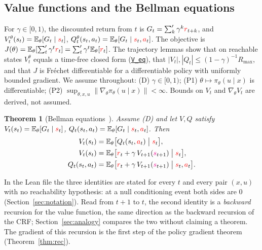 \documentclass[11pt,a4paper]{article}
\newcommand{\lmod}[2]{\href{http://www.lemma.cn/lean/?module=#2}{\nolinkurl{#1}}}
\newtheorem{theorem}{Theorem}[section]
\newcommand{\E}{\mathbb{E}}
\newcommand{\rv}[1]{{\color{red}#1}}       %
\newcommand{\ra}[1]{{\color{magenta}#1}}   %
\newcommand{\sv}{\rv{s}}
\newcommand{\av}{\rv{a}}
\newcommand{\rw}{\rv{r}}
\newcommand{\grad}{\nabla_{\theta}}
\newcommand{\tsum}{\textstyle\sum'}
\begin{document}
\subsection{Value functions and the Bellman equations}
\label{sec:bellmaneq}
For $\gamma\in[0,1)$, the discounted return from $t$ is $G_t=\tsum_k\gamma^k\rw_{t+k}$, and
$V_t^\theta(s_t)=\E_\theta[G_t\mid\sv_t]$, $Q_t^\theta(s_t,a_t)=\E_\theta[G_t\mid\sv_t,\av_t]$.
The objective is $J(\theta)=\E_\theta[\tsum_t\gamma^t\rw_t]=\tsum_t\gamma^t\E_\theta[\rw_t]$.
The trajectory lemmas show that on reachable states $V_t^\theta$ equals a time-free closed form (\lmod{V_eq}{Random.V.eq.TSum_MulPowWRc.of.Ne0Real_Preimage.In_Ico}), that $|V_t|,|Q_t|\le(1-\gamma)^{-1}R_{\max}$, and that $J$ is Fr\'echet differentiable for a differentiable policy with uniformly bounded gradient.
We assume throughout:
(D) $\gamma\in[0,1)$; (P1) $\theta\mapsto\pi_\theta(u\mid x)$ is differentiable; (P2) $\sup_{\theta,x,u}\|\grad\pi_\theta(u\mid x)\|<\infty$.
Bounds on $V_t$ and $\grad V_t$ are derived, not assumed.

\begin{theorem}[Bellman equations~\cite{lemma_bellman}]
\label{thm:bellman}
Assume (D) and let $V,Q$ satisfy $V_t(s_t)=\E_\theta[G_t\mid\sv_t]$, $Q_t(s_t,a_t)=\E_\theta[G_t\mid\sv_t,\av_t]$.
Then
\begin{align*}
V_t(s_t)&=\E_\theta\bigl[Q_t(s_t,\av_t)\bigm|\sv_t\bigr],\\
V_t(s_t)&=\E_\theta\bigl[\rw_t+\gamma\,V_{t+1}(\ra{s}_{t+1})\bigm|\sv_t\bigr],\\
Q_t(s_t,a_t)&=\E_\theta\bigl[\rw_t+\gamma\,V_{t+1}(\ra{s}_{t+1})\bigm|\sv_t,\av_t\bigr].
\end{align*}
\end{theorem}
In the Lean file the three identities are stated for every $t$ and every pair $(x,u)$ with no reachability hypothesis: at a null conditioning event both sides are $0$ (Section~\ref{sec:notation}).
Read from $t+1$ to $t$, the second identity is a \emph{backward} recursion for the value function, the same direction as the backward recursion of the CRF; Section~\ref{sec:analogy} compares the two without claiming a theorem.
The gradient of this recursion is the first step of the policy gradient theorem (Theorem~\ref{thm:rec}).
\end{document}
